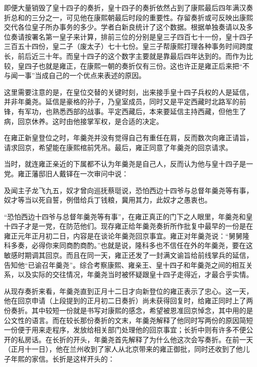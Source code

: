 
即便大量销毁了皇十四子的奏折，皇十四子的奏折依然占到了康熙最后四年满汉奏折总和的三分之一，可见他在康熙朝最后时段的重要性。存留奏折或可反映出康熙交代各位皇子所办事务的多少。学者白新良统计了这个数据。根据单独奏请以及多位奏请按署名第一皇子来计算，排前三位的分别是皇三子四百七十一份，皇十四子三百五十四份，皇二子（废太子）七十七份。皇三子帮康熙打理各种事务时间跨度长，前后近三十年。而皇十四子的这个数字主要就是靠最后四年达到的。而作为比较，皇四子也就是雍正，在康熙一朝的奏折仅有三份。这也许正是雍正后来把“不与闻一事”当成自己的一个优点来表述的原因。



这里需要注意的是，在皇位交替的关键时刻，出来接手皇十四子兵权的人是延信，并非年羹尧。延信是豪格的孙子，乃皇室成员，同时又是平定西藏时北路军的前锋，有军功，也熟悉西部的战事。平定西藏后，本来要延信主持西藏，但他生了病，回京休养。这时由他接掌军权，是合适的决定。



在雍正新皇登位之时，年羹尧并没有觉得自己有重任在肩，反而数次向雍正请旨，请求回京，希望能在康熙棺前凭吊。最后，雍正同意了年羹尧的回京请求。



当时，就连雍正亲近的下属都不认为年羹尧是自己人，反而认为他与皇十四子是一党。雍正藩邸旧人戴铎在一次审问中说：



\begin{bookquote}及闻主子龙飞九五，奴才曾向巡抚蔡珽说，恐怕西边十四爷与总督年羹尧等有事，奴才等当以死自誓，例借给兵丁钱粮，冀用其力，此奴才之愚衷也。\end{bookquote}


“恐怕西边十四爷与总督年羹尧等有事”，在雍正真正的门下之人眼里，年羹尧和皇十四子才是一党，在防范他们。现存雍正给年羹尧奏折所作批复中最早的一份是在雍正元年正月初二日，内容是在谈论年羹尧回京事宜。雍正对年羹尧说：“舅舅隆科多奏，必得你来同商酌商酌。”也就是说，隆科多也不信任在外的年羹尧，要在这敏感时期调其回京。而且在同一天，雍正还发了一封满文谕旨给前线掌兵的延信，告知他“已谕召年羹尧”。综合考察康熙、雍亲王、皇十四子和年羹尧之间的相互关系，以及实际的交往情况，年羹尧当时被怀疑跟皇十四子走得近，才最合乎实情。



从现存奏折来看，年羹尧直到正月十二日才向新登位的雍正表示了忠心。这一天，他在回京申请（上段提到的正月初二日奏折）尚未获得回复时，给雍正同时上了两份奏折。其中较短一份就是书写对康熙的感念，希望被恩准回京悼念，其中用的是公文性的语言。而在较长那份奏折的文末，年羹尧解释了他同时写两份的原因简短一份便于用来走程序，发放给相关部门处理他的回京事宜；长折中则有许多不便公开的私房话。在长折的开头，年羹尧首先解释了为什么他这次会写奏折。在前一天（正月十一日），他在兰州收到了家人从北京带来的雍正御批，同时还收到了他儿子年熙的家信。长折是这样开头的：


